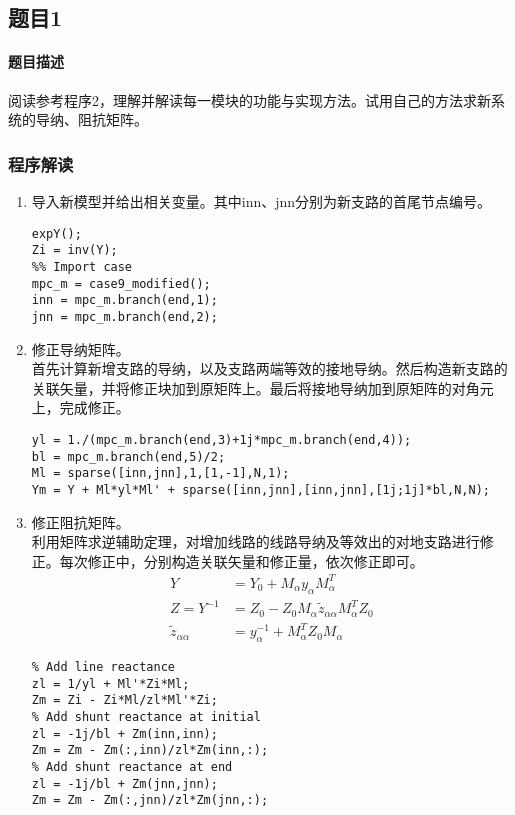 \documentclass[a4paper,12pt]{article}
\begin{document}
    \subsection{题目1}
    \paragraph{题目描述} 阅读参考程序2，理解并解读每一模块的功能与实现方法。试用自己的方法求新系统的导纳、阻抗矩阵。
    \subsubsection{程序解读}
    \begin{enumerate}
      \item 导入新模型并给出相关变量。其中inn、jnn分别为新支路的首尾节点编号。
      \begin{lstlisting}[style=Matlab-editor,basicstyle=\mlttfamily]
%% previous
expY();
Zi = inv(Y);
%% Import case
mpc_m = case9_modified();
inn = mpc_m.branch(end,1);
jnn = mpc_m.branch(end,2);
      \end{lstlisting}
      \item 修正导纳矩阵。\\
      首先计算新增支路的导纳，以及支路两端等效的接地导纳。然后构造新支路的关联矢量，并将修正块加到原矩阵上。最后将接地导纳加到原矩阵的对角元上，完成修正。
      \begin{lstlisting}[style=Matlab-editor,basicstyle=\mlttfamily]
%% Modify Y
yl = 1./(mpc_m.branch(end,3)+1j*mpc_m.branch(end,4));
bl = mpc_m.branch(end,5)/2;
Ml = sparse([inn,jnn],1,[1,-1],N,1);
Ym = Y + Ml*yl*Ml' + sparse([inn,jnn],[inn,jnn],[1j;1j]*bl,N,N);
      \end{lstlisting}
      \item 修正阻抗矩阵。\\
      利用矩阵求逆辅助定理，对增加线路的线路导纳及等效出的对地支路进行修正。每次修正中，分别构造关联矢量和修正量，依次修正即可。
      \begin{equation}
        \begin{aligned}
          Y &= Y_0+M_\alpha y_\alpha M_\alpha^T\\
          Z=Y^{-1}&= Z_0 -Z_0 M_\alpha \widetilde z_{\alpha\alpha} M_\alpha^T Z_0\\
          \widetilde z_{\alpha\alpha}&=y_\alpha^{-1}+M_\alpha^T Z_0 M_\alpha
        \end{aligned}
      \end{equation}
      \begin{lstlisting}[style=Matlab-editor,basicstyle=\mlttfamily]
%% Modify Z
% Add line reactance
zl = 1/yl + Ml'*Zi*Ml;
Zm = Zi - Zi*Ml/zl*Ml'*Zi;
% Add shunt reactance at initial
zl = -1j/bl + Zm(inn,inn);
Zm = Zm - Zm(:,inn)/zl*Zm(inn,:);
% Add shunt reactance at end
zl = -1j/bl + Zm(jnn,jnn);
Zm = Zm - Zm(:,jnn)/zl*Zm(jnn,:);
      \end{lstlisting}
    \end{enumerate}
\end{document}
